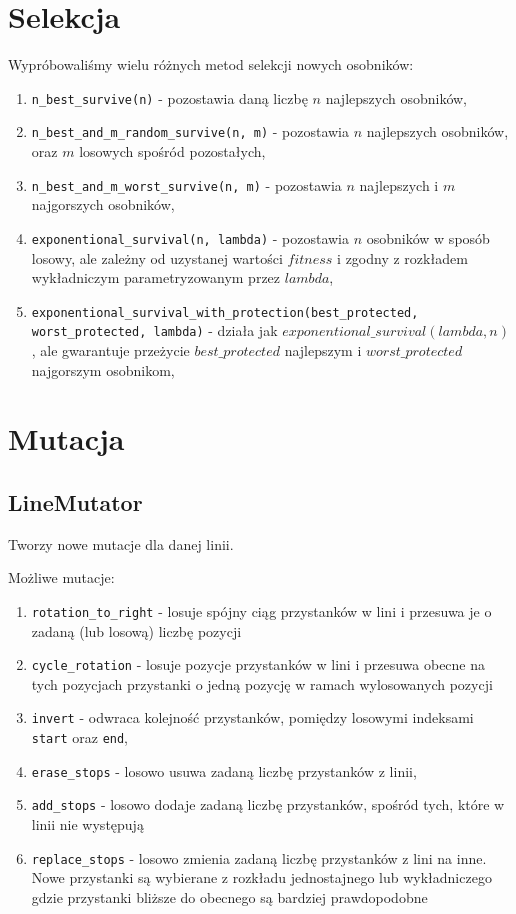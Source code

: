 \documentclass[12pt,a4paper,openright]{mwrep}
\begin{document}
\section{Selekcja}
\label{sec:selection}
Wypróbowaliśmy wielu różnych metod selekcji nowych osobników:
\begin{enumerate}
    \item \lstinline{n_best_survive(n)} - pozostawia daną liczbę $n$ najlepszych osobników,
    \item \lstinline{n_best_and_m_random_survive(n, m)} - pozostawia $n$ najlepszych osobników, oraz $m$ losowych spośród pozostałych,
    \item \lstinline{n_best_and_m_worst_survive(n, m)} - pozostawia $n$ najlepszych i $m$ najgorszych osobników,
    \item \lstinline{exponentional_survival(n, lambda)} - pozostawia $n$ osobników w sposób losowy, ale zależny od uzystanej wartości $fitness$ i zgodny z rozkładem wykładniczym parametryzowanym przez $lambda$,
    \item \lstinline{exponentional_survival_with_protection(best_protected, worst_protected, lambda)} - działa jak $exponentional\_survival(lambda, n)$, ale gwarantuje przeżycie $best\_protected$ najlepszym i $worst\_protected$ najgorszym osobnikom,
\end{enumerate}

\section{Mutacja}

\subsection{LineMutator}
Tworzy nowe mutacje dla danej linii.

Możliwe mutacje:

\begin{enumerate}
    \item \lstinline{rotation_to_right} - losuje spójny ciąg przystanków w lini i przesuwa je o zadaną (lub losową) liczbę pozycji
    \item \lstinline{cycle_rotation} - losuje pozycje przystanków w lini i przesuwa obecne na tych pozycjach przystanki o jedną pozycję w ramach wylosowanych pozycji
    \item \lstinline{invert} - odwraca kolejność przystanków, pomiędzy losowymi indeksami \lstinline{start} oraz \lstinline{end},
    \item \lstinline{erase_stops} - losowo usuwa zadaną liczbę przystanków z linii,
    \item \lstinline{add_stops} - losowo dodaje zadaną liczbę przystanków, spośród tych, które w linii nie występują
    \item \lstinline{replace_stops} - losowo zmienia zadaną liczbę przystanków z lini na inne. Nowe przystanki są wybierane z rozkładu jednostajnego lub wykładniczego gdzie przystanki bliższe do obecnego są bardziej prawdopodobne
\end{enumerate}
\end{document}
